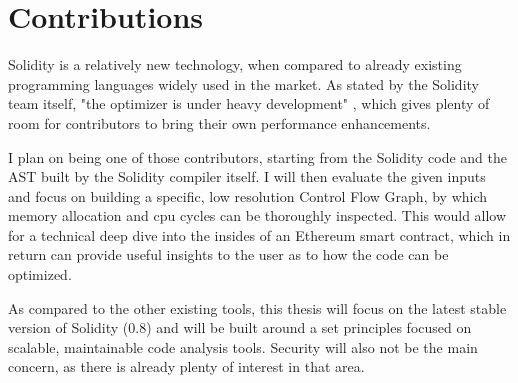 \chapter{Contributions}

Solidity is a relatively new technology, when compared to already existing programming languages widely used in the market. As stated by the Solidity team itself, "the optimizer is under heavy development" \cite{solidity-documentation}, which gives plenty of room for contributors to bring their own performance enhancements.

I plan on being one of those contributors, starting from the Solidity code and the AST built by the Solidity compiler itself. I will then evaluate the given inputs and focus on building a specific, low resolution Control Flow Graph, by which memory allocation and cpu cycles can be thoroughly inspected. This would allow for a technical deep dive into the insides of an Ethereum smart contract, which in return can provide useful insights to the user as to how the code can be optimized.

As compared to the other existing tools, this thesis will focus on the latest stable version of Solidity (0.8) and will be built around a set principles focused on scalable, maintainable code analysis tools. Security will also not be the main concern, as there is already plenty of interest in that area.